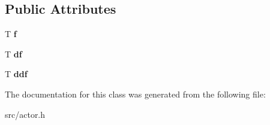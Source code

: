 \subsection*{Public Attributes}
\begin{DoxyCompactItemize}
\item 
\hypertarget{class_curve_a02a72792f2bbfea110fbe01aa867886d}{}T {\bfseries f}\label{class_curve_a02a72792f2bbfea110fbe01aa867886d}

\item 
\hypertarget{class_curve_a6a8808bc765a4cb3e8dc3e55c9d85acc}{}T {\bfseries df}\label{class_curve_a6a8808bc765a4cb3e8dc3e55c9d85acc}

\item 
\hypertarget{class_curve_a339f0053ae5bd5b9bf8ae8cc2e0a558f}{}T {\bfseries ddf}\label{class_curve_a339f0053ae5bd5b9bf8ae8cc2e0a558f}

\end{DoxyCompactItemize}


The documentation for this class was generated from the following file\+:\begin{DoxyCompactItemize}
\item 
src/actor.\+h\end{DoxyCompactItemize}

